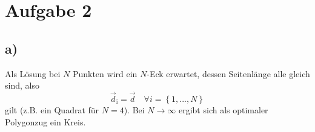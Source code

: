 \section*{Aufgabe 2}

\subsection*{a)}
Als Lösung bei $N$ Punkten wird ein $N$-Eck erwartet, dessen Seitenlänge alle gleich sind,
also
\begin{equation*}
  \vec{d}_\text{i} = \vec{d} \quad \forall i=\left\{1, ..., N\right\}
\end{equation*}
gilt (z.B. ein Quadrat für $N = 4$).
Bei $N \rightarrow \infty$ ergibt sich als optimaler Polygonzug ein Kreis.
